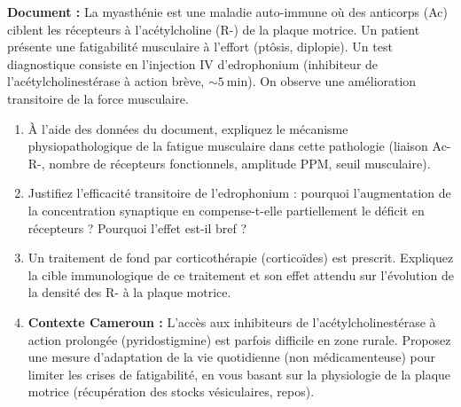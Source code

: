 \documentclass[11pt]{article}
\begin{document}
\begin{exercice}
\textbf{Document :} La myasthénie est une maladie auto-immune où des anticorps (Ac) ciblent les récepteurs à l'acétylcholine (R-) de la plaque motrice. Un patient présente une fatigabilité musculaire à l'effort (ptôsis, diplopie). Un test diagnostique consiste en l'injection IV d'edrophonium (inhibiteur de l'acétylcholinestérase à action brève, $\sim \SI{5}{\minute}$). On observe une amélioration transitoire de la force musculaire.
\begin{enumerate}
    \item À l'aide des données du document, expliquez le mécanisme physiopathologique de la fatigue musculaire dans cette pathologie (liaison Ac-R-, nombre de récepteurs fonctionnels, amplitude PPM, seuil musculaire).
    \item Justifiez l'efficacité transitoire de l'edrophonium : pourquoi l'augmentation de la concentration synaptique en  compense-t-elle partiellement le déficit en récepteurs ? Pourquoi l'effet est-il bref ?
    \item Un traitement de fond par corticothérapie (corticoïdes) est prescrit. Expliquez la cible immunologique de ce traitement et son effet attendu sur l'évolution de la densité des R- à la plaque motrice.
    \item \textbf{Contexte Cameroun :} L'accès aux inhibiteurs de l'acétylcholinestérase à action prolongée (pyridostigmine) est parfois difficile en zone rurale. Proposez une mesure d'adaptation de la vie quotidienne (non médicamenteuse) pour limiter les crises de fatigabilité, en vous basant sur la physiologie de la plaque motrice (récupération des stocks vésiculaires, repos).
\end{enumerate}
\end{exercice}
\end{document}

